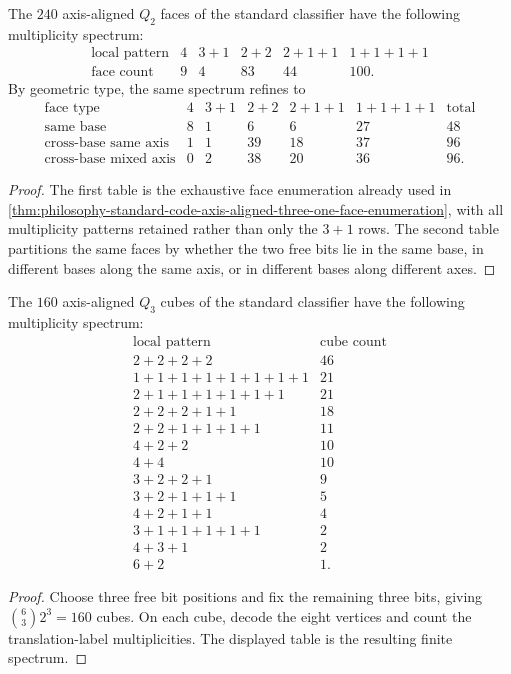 \begin{theorem}
\label{thm:philosophy-standard-code-q-two-face-spectrum}
The $240$ axis-aligned $Q_{2}$ faces of the standard classifier have
the following multiplicity spectrum:
$$
\begin{array}{c|rrrrr}
  \text{local pattern}
    & 4 & 3+1 & 2+2 & 2+1+1 & 1+1+1+1\\
\hline
  \text{face count}
    & 9 & 4 & 83 & 44 & 100.
\end{array}
$$
By geometric type, the same spectrum refines to
$$
\begin{array}{c|rrrrr|r}
  \text{face type}
    & 4 & 3+1 & 2+2 & 2+1+1 & 1+1+1+1 & \text{total}\\
\hline
  \text{same base}
    & 8 & 1 & 6 & 6 & 27 & 48\\
  \text{cross-base same axis}
    & 1 & 1 & 39 & 18 & 37 & 96\\
  \text{cross-base mixed axis}
    & 0 & 2 & 38 & 20 & 36 & 96.
\end{array}
$$
\end{theorem}
\begin{proof}
The first table is the exhaustive face enumeration already used in
\autoref{thm:philosophy-standard-code-axis-aligned-three-one-face-enumeration},
with all multiplicity patterns retained rather than only the $3+1$
rows. The second table partitions the same faces by whether the two
free bits lie in the same base, in different bases along the same
axis, or in different bases along different axes.
\end{proof}

\begin{theorem}
\label{thm:philosophy-standard-code-q-three-cube-spectrum}
The $160$ axis-aligned $Q_{3}$ cubes of the standard classifier have
the following multiplicity spectrum:
$$
\begin{array}{c|r}
  \text{local pattern} & \text{cube count}\\
\hline
  2+2+2+2 & 46\\
  1+1+1+1+1+1+1+1 & 21\\
  2+1+1+1+1+1+1 & 21\\
  2+2+2+1+1 & 18\\
  2+2+1+1+1+1 & 11\\
  4+2+2 & 10\\
  4+4 & 10\\
  3+2+2+1 & 9\\
  3+2+1+1+1 & 5\\
  4+2+1+1 & 4\\
  3+1+1+1+1+1 & 2\\
  4+3+1 & 2\\
  6+2 & 1.
\end{array}
$$
\end{theorem}
\begin{proof}
Choose three free bit positions and fix the remaining three bits, giving
$\binom{6}{3}2^{3}=160$ cubes. On each cube, decode the eight vertices
and count the translation-label multiplicities. The displayed table is
the resulting finite spectrum.
\end{proof}

